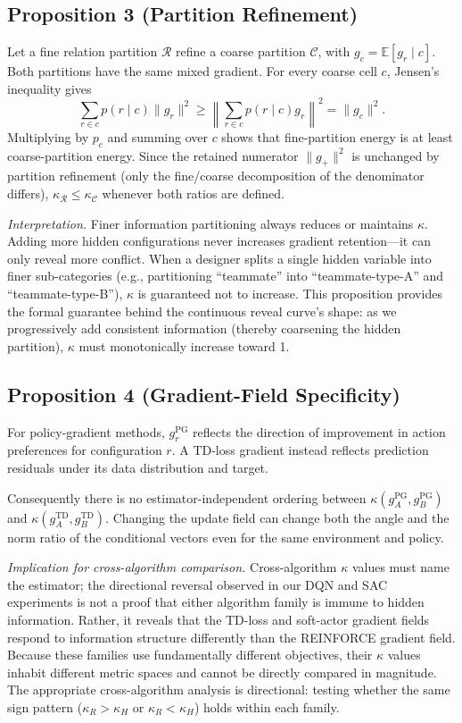 \documentclass[letterpaper]{article}
\begin{document}
\subsection{Proposition 3 (Partition Refinement)}

Let a fine relation partition $\mathcal{R}$ refine a coarse partition
$\mathcal{C}$, with $g_c=\mathbb{E}[g_r\mid c]$.
Both partitions have the same mixed gradient. For every coarse cell $c$,
Jensen's inequality gives
\begin{equation}
\sum_{r\in c} p(r\mid c)\|g_r\|^2
\geq
\left\|\sum_{r\in c}p(r\mid c)g_r\right\|^2
=\|g_c\|^2.
\end{equation}
Multiplying by $p_c$ and summing over $c$ shows that fine-partition energy is
at least coarse-partition energy. Since the retained numerator $\|g_+\|^2$ is unchanged by partition refinement (only the fine/coarse decomposition of the denominator differs),
$\kappa_{\mathcal{R}} \leq \kappa_{\mathcal{C}}$ whenever both ratios are
defined.

\noindent\textit{Interpretation.}
Finer information partitioning always reduces or maintains $\kappa$.
Adding more hidden configurations never increases gradient retention---it can only reveal more conflict.
When a designer splits a single hidden variable into finer sub-categories (e.g., partitioning ``teammate'' into ``teammate-type-A'' and ``teammate-type-B''), $\kappa$ is guaranteed not to increase.
This proposition provides the formal guarantee behind the continuous reveal curve's shape: as we progressively add consistent information (thereby coarsening the hidden partition), $\kappa$ must monotonically increase toward 1.

\subsection{Proposition 4 (Gradient-Field Specificity)}

For policy-gradient methods, $g_r^{\text{PG}}$ reflects the direction of
improvement in action preferences for configuration $r$. A TD-loss gradient
instead reflects prediction residuals under its data distribution and target.

Consequently there is no estimator-independent ordering between
$\kappa(g_A^{\text{PG}},g_B^{\text{PG}})$ and
$\kappa(g_A^{\text{TD}},g_B^{\text{TD}})$. Changing the update field can change
both the angle and the norm ratio of the conditional vectors even for the same
environment and policy.

\noindent\textit{Implication for cross-algorithm comparison.}
Cross-algorithm $\kappa$ values must name the estimator; the directional reversal observed in our DQN and SAC experiments is not a proof that either algorithm family is immune to hidden information. Rather, it reveals that the TD-loss and soft-actor gradient fields respond to information structure differently than the REINFORCE gradient field.
Because these families use fundamentally different objectives, their $\kappa$ values inhabit different metric spaces and cannot be directly compared in magnitude. The appropriate cross-algorithm analysis is directional: testing whether the same sign pattern ($\kappa_R > \kappa_H$ or $\kappa_R < \kappa_H$) holds within each family.
\end{document}
